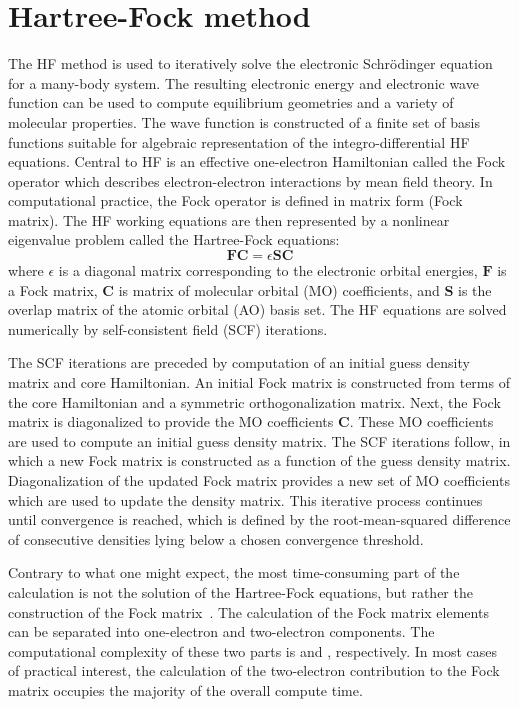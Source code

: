 \section{Hartree-Fock method}
\label{sec:hf}
The HF method is used to iteratively solve the electronic Schr\"odinger equation for a many-body system. The resulting electronic energy and electronic wave function can be used to compute equilibrium geometries and a variety of molecular properties. The wave function is constructed of a finite set of basis functions suitable for algebraic representation of the integro-differential HF equations.  Central to HF is an effective one-electron Hamiltonian called the Fock operator which describes electron-electron interactions by mean field theory. In computational practice, the Fock operator is defined in matrix form (Fock matrix). The HF working equations are then represented by a nonlinear eigenvalue problem called the Hartree-Fock equations: 
\begin{equation}\label{eqn:scf}
	\mathbf{FC}={\epsilon}\mathbf{SC}
\end{equation}
where $\epsilon$ is a diagonal matrix corresponding to the electronic orbital energies, $\mathbf{F}$ is a Fock matrix, $\mathbf{C}$ is matrix of molecular orbital (MO) coefficients, and $\mathbf{S}$ is the overlap matrix of the atomic orbital (AO) basis set. The HF equations are solved numerically by self-consistent field (SCF) iterations.

The SCF iterations are preceded by computation of an initial guess density matrix and core Hamiltonian. An initial Fock matrix is constructed from terms of the core Hamiltonian and a symmetric orthogonalization matrix. Next, the Fock matrix is diagonalized to provide the MO coefficients $\mathbf{C}$. These MO coefficients are used to compute an initial guess density matrix. The SCF iterations follow, in which a new Fock matrix is constructed as a function of the guess density matrix. Diagonalization of the updated Fock matrix provides a new set of MO coefficients which are used to update the density matrix. This iterative process continues until convergence is reached, which is defined by the root-mean-squared difference of consecutive densities lying below a chosen convergence threshold.

Contrary to what one might expect, the most time-consuming part of the calculation is not the solution of the Hartree-Fock equations, but rather the construction of the Fock matrix~\cite{janssen2008}. The calculation of the Fock matrix elements can be separated into one-electron and two-electron components. The computational complexity of these two parts is  and , respectively. In most cases of practical interest, the calculation of the two-electron contribution to the Fock matrix occupies the majority of the overall compute time.